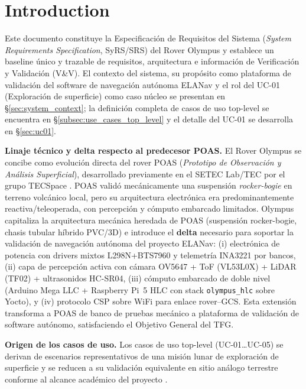 
\section{Introduction}
 Este documento constituye la Especificación de Requisitos del Sistema (\textit{System Requirements Specification}, SyRS/SRS) del Rover Olympus y establece un baseline único y trazable de requisitos, arquitectura e información de Verificación y Validación (V\&V). El contexto del sistema, su propósito como plataforma de validación del software de navegación autónoma ELANav y el rol del UC-01 (Exploración de superficie) como caso núcleo se presentan en §\ref{sec:system_context}; la definición completa de casos de uso top-level se encuentra en §\ref{subsec:use_cases_top_level} y el detalle del UC-01 se desarrolla en §\ref{sec:uc01}.

\textbf{Linaje técnico y delta respecto al predecesor POAS.} El Rover Olympus se concibe como evolución directa del rover POAS (\textit{Prototipo de Observación y Análisis Superficial}), desarrollado previamente en el SETEC Lab/TEC por el grupo TECSpace \cite{tecspace2021poas}. POAS validó mecánicamente una suspensión \textit{rocker-bogie} en terreno volcánico local, pero su arquitectura electrónica era predominantemente reactiva/teleoperada, con percepción y cómputo embarcado limitados. Olympus capitaliza la arquitectura mecánica heredada de POAS (suspensión rocker-bogie, chasis tubular híbrido PVC/3D) e introduce el \textbf{delta} necesario para soportar la validación de navegación autónoma del proyecto ELANav: (i) electrónica de potencia con drivers mixtos L298N+BTS7960 y telemetría INA3221 por bancos, (ii) capa de percepción activa con cámara OV5647 + ToF (VL53L0X) + LiDAR (TF02) + ultrasonidos HC-SR04, (iii) cómputo embarcado de doble nivel (Arduino Mega LLC + Raspberry Pi~5 HLC con stack \texttt{olympus\_hlc} sobre Yocto), y (iv) protocolo CSP sobre WiFi para enlace rover--GCS. Esta extensión transforma a POAS de banco de pruebas mecánico a plataforma de validación de software autónomo, satisfaciendo el Objetivo General del TFG.

\textbf{Origen de los casos de uso.} Los casos de uso top-level (UC-01\dots UC-05) se derivan de escenarios representativos de una misión lunar de exploración de superficie y se reducen a su validación equivalente en sitio análogo terrestre conforme al alcance académico del proyecto \cite{ieee_29148, nasa_se_handbook}.


